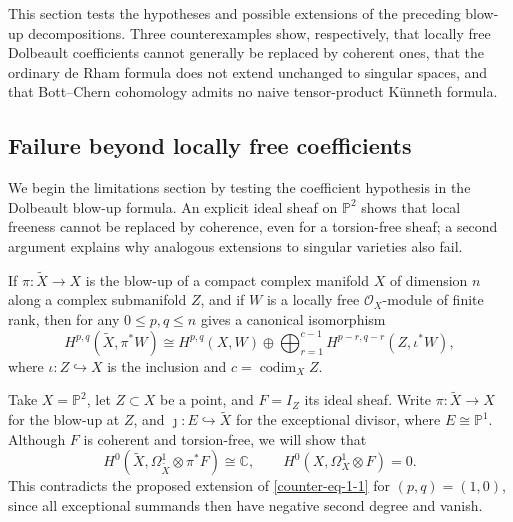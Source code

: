 \documentclass[11pt]{amsart}
\numberwithin{equation}{section}
\theoremstyle{plain}
\theoremstyle{definition}
\begin{document}
This section tests the hypotheses and possible extensions of the preceding
blow-up decompositions.  Three counterexamples show, respectively, that
locally free Dolbeault coefficients cannot generally be replaced by
coherent ones, that the ordinary de Rham formula does not extend unchanged
to singular spaces, and that Bott--Chern cohomology admits no naive
tensor-product K\"unneth formula.

\subsection{Failure beyond locally free coefficients}
\label{subsec-failure-locally-free-coefficients}

We begin the limitations section by testing the coefficient hypothesis in
the Dolbeault blow-up formula.  An explicit ideal sheaf on $\mathbb P^2$
shows that local freeness cannot be replaced by coherence, even for a
torsion-free sheaf; a second argument explains why analogous extensions to
singular varieties also fail.

If $\pi:\tilde{X}\longrightarrow X$ is the blow-up of a compact complex
manifold $X$ of dimension $n$ along a complex submanifold $Z$, and if $W$ is
a locally free $\mathcal O_X$-module of finite rank, then for any
$0\leq p,q\leq n$ \cite[Theorem~1.2]{RYY20} gives a canonical
isomorphism 
\begin{equation}\label{counter-eq-1-1}
H^{p,q}(\tilde{X},\pi^*W)
\cong H^{p,q}(X,W)\oplus
\bigoplus_{r=1}^{c-1}H^{p-r,q-r}(Z,\iota^*W),
\end{equation}
where $\iota:Z\hookrightarrow X$ is the inclusion and
$c=\operatorname{codim}_X Z$.

Take $X=\mathbb P^2$, let $Z\subset X$ be a point, and $F=I_Z$
its ideal sheaf.  Write $\pi:\tilde{X}\longrightarrow X$ for the blow-up
at $Z$, and $\jmath:E\hookrightarrow\tilde{X}$ for the exceptional divisor,
where $E\cong\mathbb P^1$.  Although $F$ is coherent and torsion-free,
we will show that
\begin{equation}\label{counter-eq-1-2}
H^0(\tilde{X},\Omega^1_{\tilde{X}}\otimes\pi^*F)\cong\mathbb C,
\qquad H^0(X,\Omega_X^1\otimes F)=0.
\end{equation}
This contradicts the proposed extension of \eqref{counter-eq-1-1} for
$(p,q)=(1,0)$, since all exceptional summands then have negative second
degree and vanish.
\end{document}

